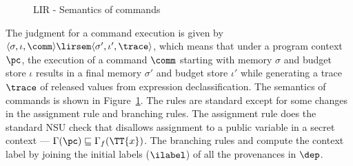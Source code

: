 \begin{figure}[!htbp]
\begin{framed}
\end{framed}
\caption{LIR - Semantics of commands}
\label{fig:lir:sem-c}
\end{figure}


The judgment for a command execution is given by $\langle \sigma,
\iota, \comm \rangle \lirsem \langle \sigma', \iota', \trace \rangle$,
which means that under a program context $\pc$, the execution of a
command $\comm$ starting with memory $\sigma$ and budget store $\iota$
results in a final memory $\sigma'$ and budget store $\iota'$ while
generating a trace $\trace$ of released values from expression
declassification. The semantics of commands is shown in
Figure~\ref{fig:lir:sem-c}. The rules are standard except for some changes
in the assignment rule and branching rules. The assignment rule
 does the standard NSU check that disallows
assignment to a public variable in a secret context --- $\Gamma(\pc)
\sqsubseteq \Gamma_f(\TT{x})$. The branching rules
 and  compute the context
label by joining the initial labels ($\ilabel$) of all the provenances
in $\dep$.
